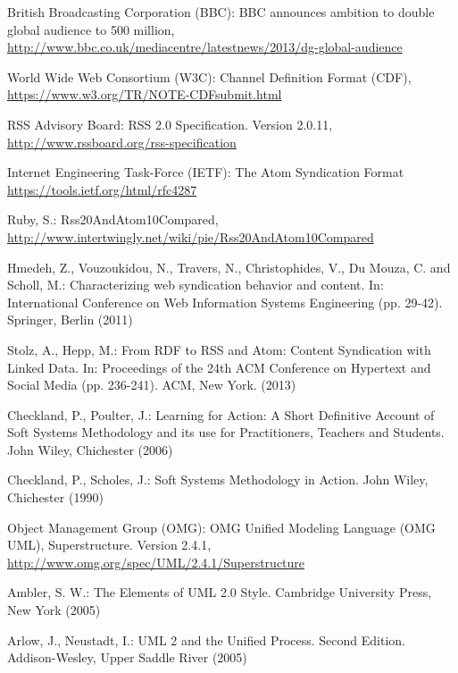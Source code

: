 \documentclass[runningheads,a4paper]{llncs}
\begin{document}
\begin{thebibliography}{}

 British Broadcasting Corporation (BBC): BBC announces ambition to double global audience to 500 million,\\
\url{http://www.bbc.co.uk/mediacentre/latestnews/2013/dg-global-audience}

 World Wide Web Consortium (W3C): Channel Definition Format (CDF),\\
\url{https://www.w3.org/TR/NOTE-CDFsubmit.html}

 RSS Advisory Board: RSS 2.0 Specification. Version 2.0.11,\\
\url{http://www.rssboard.org/rss-specification}

 Internet Engineering Task-Force (IETF): The Atom Syndication Format\\
\url{https://tools.ietf.org/html/rfc4287}

 Ruby, S.: Rss20AndAtom10Compared,\\
\url{http://www.intertwingly.net/wiki/pie/Rss20AndAtom10Compared}

 Hmedeh, Z., Vouzoukidou, N., Travers, N., Christophides, V., Du Mouza, C. and Scholl, M.: Characterizing web syndication behavior and content. In: International Conference on Web Information Systems Engineering (pp. 29-42). Springer, Berlin (2011)

 Stolz, A., Hepp, M.: From RDF to RSS and Atom:
Content Syndication with Linked Data. In: Proceedings of the 24th ACM Conference on Hypertext and Social Media (pp. 236-241). ACM, New York. (2013)

 Checkland, P., Poulter, J.: Learning for Action: A Short Definitive Account of Soft Systems Methodology and its use for Practitioners, Teachers and Students. John Wiley, Chichester (2006)

 Checkland, P., Scholes, J.: Soft Systems Methodology in Action. John Wiley, Chichester (1990)

 Object Management Group (OMG): OMG Unified Modeling Language (OMG UML), Superstructure. Version 2.4.1,\\
\url{http://www.omg.org/spec/UML/2.4.1/Superstructure}

 Ambler, S. W.: The Elements of UML 2.0 Style. Cambridge University Press, New York (2005)

 Arlow, J., Neustadt, I.: UML 2 and the Unified Process. Second Edition. Addison-Wesley, Upper Saddle River (2005)


\end{thebibliography}
\end{document}
